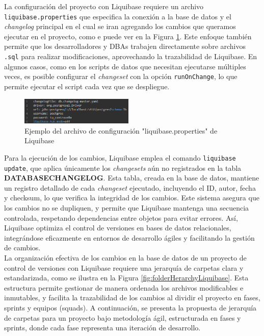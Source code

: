 \documentclass{IEEEtran}
\begin{document}
La configuración del proyecto con Liquibase requiere un archivo \texttt{liquibase.properties} que especifica la conexión a la base de datos y el \textit{changelog} principal en el cual se iran agregando los cambios que queramos ejecutar en el proyecto, como e puede ver en la Figura \ref{fig:liquibasePropertiesExample}. Este enfoque también permite que los desarrolladores y DBAs trabajen directamente sobre archivos \texttt{.sql} para realizar modificaciones, aprovechando la trazabilidad de Liquibase. En algunos casos, como en los scripts de datos que necesitan ejecutarse múltiples veces, es posible configurar el \textit{changeset} con la opción \texttt{runOnChange}, lo que permite ejecutar el script cada vez que se despliegue.

\begin{figure}[H]
    \centering
    \includegraphics[width=0.48\textwidth]{images/liquibasePropertiesExample.png}
    \caption{Ejemplo del archivo de configuración "liquibase.properties" de Liquibase}
    \label{fig:liquibasePropertiesExample}
\end{figure}

Para la ejecución de los cambios, Liquibase emplea el comando \texttt{liquibase update}, que aplica únicamente los \textit{changesets} aún no registrados en la tabla \textbf{DATABASECHANGELOG}. Esta tabla, creada en la base de datos, mantiene un registro detallado de cada \textit{changeset} ejecutado, incluyendo el ID, autor, fecha y checksum, lo que verifica la integridad de los cambios. Este sistema asegura que los cambios no se dupliquen, y permite que Liquibase mantenga una secuencia controlada, respetando dependencias entre objetos para evitar errores. Así, Liquibase optimiza el control de versiones en bases de datos relacionales, integrándose eficazmente en entornos de desarrollo ágiles y facilitando la gestión de cambios.\\

La organización efectiva de los cambios en la base de datos de un proyecto de control de versiones con Liquibase requiere una jerarquía de carpetas clara y estandarizada, como se ilustra en la Figura \ref{fig:folderHerarchyLiquibase}. Esta estructura permite gestionar de manera ordenada los archivos modificables e inmutables, y facilita la trazabilidad de los cambios al dividir el proyecto en fases, sprints y equipos (squads). A continuación, se presenta la propuesta de jerarquía de carpetas para un proyecto bajo metodología ágil, estructurada en fases y sprints, donde cada fase representa una iteración de desarrollo.
\end{document}
